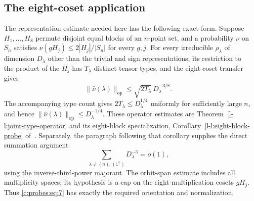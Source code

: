 \subsection{The eight-coset application}
\label{c:probes:eight-coset-application}
The representation estimate needed here has the following exact form.
Suppose $H_1,\ldots,H_8$ permute disjoint equal blocks of an $n$-point set,
and a probability $\nu$ on $S_n$ satisfies
$\nu(gH_j)\le2|H_j|/|S_n|$ for every $g,j$. For every irreducible
$\rho_\lambda$ of dimension $D_\lambda$ other than the trivial and sign
representations, its restriction to the product of the $H_j$ has
$T_\lambda$ distinct tensor types, and the eight-coset transfer gives
\begin{equation}\label{c:probes:eq:8}
 \|\widehat\nu(\lambda)\|_{\mathrm{op}}
 \le\sqrt{2T_\lambda}\,D_\lambda^{-3/8}.
\end{equation}
The accompanying type count gives $2T_\lambda\le D_\lambda^{1/4}$
uniformly for sufficiently large $n$, and hence
$\|\widehat\nu(\lambda)\|_{\mathrm{op}}\le D_\lambda^{-1/4}$.
These operator estimates are Theorem~\ref*{l-l:joint-type-operator}
and its eight-block specialization,
Corollary~\ref*{l-l:eight-block-probe} of~\cite{partialFourier}.
Separately, the paragraph following that corollary supplies the direct
summation argument
\begin{equation}\label{c:probes:eq:9}
 \sum_{\lambda\ne(n),(1^n)}D_\lambda^{-3}=o(1),
\end{equation}
using the inverse-third-power majorant. The orbit-span estimate
includes all multiplicity spaces; its hypothesis is a cap on the
right-multiplication cosets $gH_j$.
Thus \eqref{c:probes:eq:7} has exactly the required orientation and
normalization.

\label{c:probes:p029}

